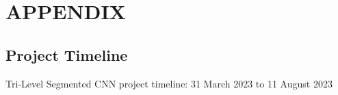 \clearpage
\appendix
{}
\section{APPENDIX}


\subsection{Project Timeline}
Tri-Level Segmented CNN project timeline:
31 March 2023 to 11 August 2023


